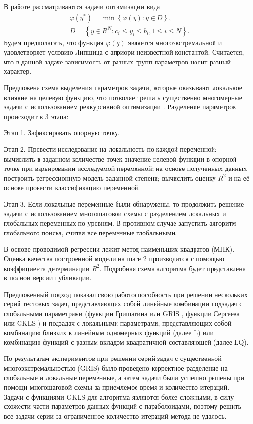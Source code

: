 \documentclass[11pt, oneside, a4paper]{article}
\begin{document}
В работе рассматриваются задачи оптимизации вида 
\begin{eqnarray}\label{main_problem}
& \varphi(y^\ast)=\min{\left\{\varphi(y): y\in D\right\}}, \nonumber \\
& D=\left\{y\in R^N: a_i\leq y_i \leq b_i, 1\leq i \leq N\right\}. \nonumber
\end{eqnarray}
Будем предполагать, что функция $\varphi(y)$ является многоэкстремальной и удовлетворяет условию Липшица с априори неизвестной константой. Считается, что в данной задаче зависимость от разных групп параметров носит разный характер.

Предложена схема выделения параметров задачи, которые оказывают локальное влияние на целевую функцию, что позволяет решать существенно многомерные задачи с использованием реккурсивной оптимизации \cite{Carr}. Разделение параметров происходит в 3 этапа:

Этап 1. Зафиксировать опорную точку. 

Этап 2. Провести исследование на локальность по каждой переменной: вычислить в заданном количестве точек значение целевой функции в опорной точке при варьировании исследуемой переменной; на основе полученных данных построить регрессионную модель заданной степени; вычислить оценку $R^2$ и на её основе провести классификацию переменной.

Этап 3. Если локальные переменные были обнаружены, то продолжить решение задачи с использованием многошаговой схемы с разделением локальных и глобальных переменных по уровням. В противном случае запустить алгоритм глобального поиска, считая все переменные глобальными.

В основе проводимой регрессии лежит метод наименьших квадратов (МНК). Оценка качества построенной модели на шаге 2 производится с помощью коэффициента детерминации $R^2$. Подробная схема алгоритма будет представлена в полной версии публикации.

Предложенный подход показал свою работоспособность при решении нескольких серий тестовых задач, представляющих собой линейные комбинации подзадач с глобальными параметрами (функции Гришагина или GRIS \cite{Grishagin1994}, функции Сергеева или GKLS \cite{Sergeyev2015,Grishagin2018}) и подзадач с локальными параметрами, представляющих собой комбинацию близких к линейным одномерных функций (далее L) или  комбинацию  функций с разным вкладом квадратичной составляющей (далее LQ).

По результатам экспериментов при решении серий задач с существенной многоэкстремальностью (GRIS) было проведено корректное разделение на глобальные и локальные переменные, а затем задачи были успешно решены при помощи многошаговой схемы за приемлемое время и количество итераций. Задачи с функциями  GKLS для алгоритма являются более сложными, в силу схожести части параметров данных функций с параболоидами, поэтому решить все задачи серии за ограниченное количество итераций метода не удалось.
\end{document}
